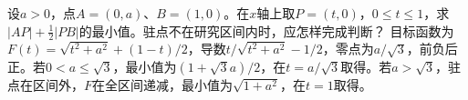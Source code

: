设\(a>0\)，点\(A=(0,a)\)、\(B=(1,0)\)。在\(x\)轴上取\(P=(t,0)\)，\(0\le t\le1\)，求\(|AP|+\tfrac12|PB|\)的最小值。驻点不在研究区间内时，应怎样完成判断？
\solutionanswer
目标函数为\(F(t)=\sqrt{t^2+a^2}+(1-t)/2\)，导数\(t/\sqrt{t^2+a^2}-1/2\)，零点为\(a/\sqrt3\)，前负后正。若\(0<a\le\sqrt3\)，最小值为\((1+\sqrt3a)/2\)，在\(t=a/\sqrt3\)取得。若\(a>\sqrt3\)，驻点在区间外，\(F\)在全区间递减，最小值为\(\sqrt{1+a^2}\)，在\(t=1\)取得。
\par
